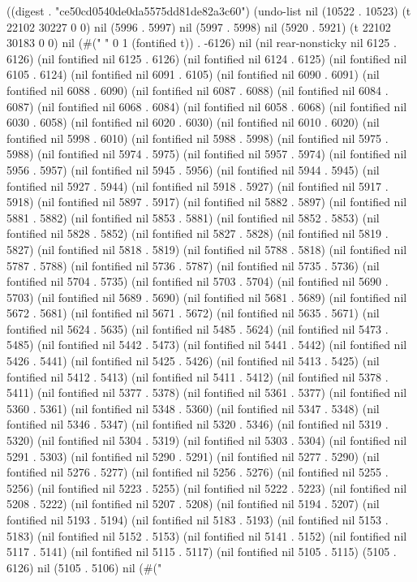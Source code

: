 
((digest . "ce50cd0540de0da5575dd81de82a3c60") (undo-list nil (10522 . 10523) (t 22102 30227 0 0) nil (5996 . 5997) nil (5997 . 5998) nil (5920 . 5921) (t 22102 30183 0 0) nil (#("
" 0 1 (fontified t)) . -6126) nil (nil rear-nonsticky nil 6125 . 6126) (nil fontified nil 6125 . 6126) (nil fontified nil 6124 . 6125) (nil fontified nil 6105 . 6124) (nil fontified nil 6091 . 6105) (nil fontified nil 6090 . 6091) (nil fontified nil 6088 . 6090) (nil fontified nil 6087 . 6088) (nil fontified nil 6084 . 6087) (nil fontified nil 6068 . 6084) (nil fontified nil 6058 . 6068) (nil fontified nil 6030 . 6058) (nil fontified nil 6020 . 6030) (nil fontified nil 6010 . 6020) (nil fontified nil 5998 . 6010) (nil fontified nil 5988 . 5998) (nil fontified nil 5975 . 5988) (nil fontified nil 5974 . 5975) (nil fontified nil 5957 . 5974) (nil fontified nil 5956 . 5957) (nil fontified nil 5945 . 5956) (nil fontified nil 5944 . 5945) (nil fontified nil 5927 . 5944) (nil fontified nil 5918 . 5927) (nil fontified nil 5917 . 5918) (nil fontified nil 5897 . 5917) (nil fontified nil 5882 . 5897) (nil fontified nil 5881 . 5882) (nil fontified nil 5853 . 5881) (nil fontified nil 5852 . 5853) (nil fontified nil 5828 . 5852) (nil fontified nil 5827 . 5828) (nil fontified nil 5819 . 5827) (nil fontified nil 5818 . 5819) (nil fontified nil 5788 . 5818) (nil fontified nil 5787 . 5788) (nil fontified nil 5736 . 5787) (nil fontified nil 5735 . 5736) (nil fontified nil 5704 . 5735) (nil fontified nil 5703 . 5704) (nil fontified nil 5690 . 5703) (nil fontified nil 5689 . 5690) (nil fontified nil 5681 . 5689) (nil fontified nil 5672 . 5681) (nil fontified nil 5671 . 5672) (nil fontified nil 5635 . 5671) (nil fontified nil 5624 . 5635) (nil fontified nil 5485 . 5624) (nil fontified nil 5473 . 5485) (nil fontified nil 5442 . 5473) (nil fontified nil 5441 . 5442) (nil fontified nil 5426 . 5441) (nil fontified nil 5425 . 5426) (nil fontified nil 5413 . 5425) (nil fontified nil 5412 . 5413) (nil fontified nil 5411 . 5412) (nil fontified nil 5378 . 5411) (nil fontified nil 5377 . 5378) (nil fontified nil 5361 . 5377) (nil fontified nil 5360 . 5361) (nil fontified nil 5348 . 5360) (nil fontified nil 5347 . 5348) (nil fontified nil 5346 . 5347) (nil fontified nil 5320 . 5346) (nil fontified nil 5319 . 5320) (nil fontified nil 5304 . 5319) (nil fontified nil 5303 . 5304) (nil fontified nil 5291 . 5303) (nil fontified nil 5290 . 5291) (nil fontified nil 5277 . 5290) (nil fontified nil 5276 . 5277) (nil fontified nil 5256 . 5276) (nil fontified nil 5255 . 5256) (nil fontified nil 5223 . 5255) (nil fontified nil 5222 . 5223) (nil fontified nil 5208 . 5222) (nil fontified nil 5207 . 5208) (nil fontified nil 5194 . 5207) (nil fontified nil 5193 . 5194) (nil fontified nil 5183 . 5193) (nil fontified nil 5153 . 5183) (nil fontified nil 5152 . 5153) (nil fontified nil 5141 . 5152) (nil fontified nil 5117 . 5141) (nil fontified nil 5115 . 5117) (nil fontified nil 5105 . 5115) (5105 . 6126) nil (5105 . 5106) nil (#("
